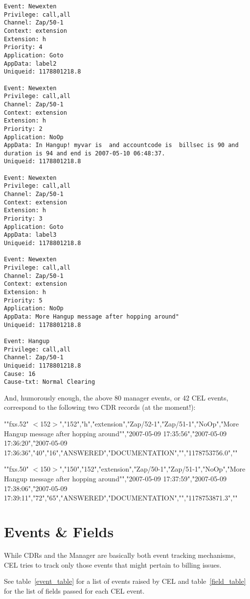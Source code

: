 \begin{astlisting}
\begin{verbatim}
Event: Newexten
Privilege: call,all
Channel: Zap/50-1
Context: extension
Extension: h
Priority: 4
Application: Goto
AppData: label2
Uniqueid: 1178801218.8

Event: Newexten
Privilege: call,all
Channel: Zap/50-1
Context: extension
Extension: h
Priority: 2
Application: NoOp
AppData: In Hangup! myvar is  and accountcode is  billsec is 90 and duration is 94 and end is 2007-05-10 06:48:37.
Uniqueid: 1178801218.8

Event: Newexten
Privilege: call,all
Channel: Zap/50-1
Context: extension
Extension: h
Priority: 3
Application: Goto
AppData: label3
Uniqueid: 1178801218.8

Event: Newexten
Privilege: call,all
Channel: Zap/50-1
Context: extension
Extension: h
Priority: 5
Application: NoOp
AppData: More Hangup message after hopping around"
Uniqueid: 1178801218.8

Event: Hangup
Privilege: call,all
Channel: Zap/50-1
Uniqueid: 1178801218.8
Cause: 16
Cause-txt: Normal Clearing
\end{verbatim}
\end{astlisting}

And, humorously enough, the above 80 manager events, or 42 CEL events,
correspond to the following two CDR records (at the moment!):

\begin{astlisting}
""fxs.52" $<$152$>$","152","h","extension","Zap/52-1","Zap/51-1","NoOp","More Hangup message after hopping around"","2007-05-09 17:35:56","2007-05-09 17:36:20","2007-05-09 17:36:36","40","16","ANSWERED","DOCUMENTATION","","1178753756.0",""

""fxs.50" $<$150$>$","150","152","extension","Zap/50-1","Zap/51-1","NoOp","More Hangup message after hopping around"","2007-05-09 17:37:59","2007-05-09 17:38:06","2007-05-09 17:39:11","72","65","ANSWERED","DOCUMENTATION","","1178753871.3",""
\end{astlisting}


\section{Events \& Fields}

While CDRs and the Manager are basically both event tracking mechanisms, CEL
tries to track only those events that might pertain to billing issues.

See table~\ref{event_table} for a list of events raised by CEL and
table~\ref{field_table} for the list of fields passed for each CEL event.

